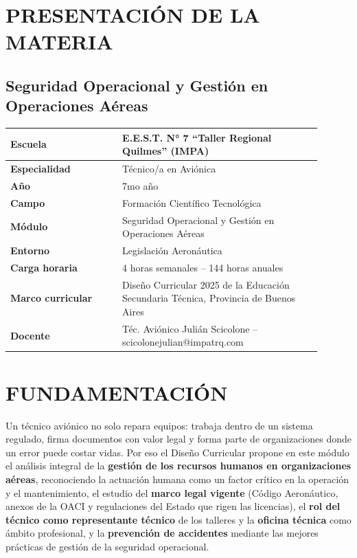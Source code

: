 \section*{PRESENTACIÓN DE LA MATERIA}
\subsection*{Seguridad Operacional y Gestión en Operaciones Aéreas}

\begin{center}
\small
\begin{tabular}{|p{0.32\linewidth}|p{0.58\linewidth}|}
\hline
\textbf{Escuela} & E.E.S.T. N° 7 ``Taller Regional Quilmes'' (IMPA) \\ \hline
\textbf{Especialidad} & Técnico/a en Aviónica \\ \hline
\textbf{Año} & 7mo año \\ \hline
\textbf{Campo} & Formación Científico Tecnológica \\ \hline
\textbf{Módulo} & Seguridad Operacional y Gestión en Operaciones Aéreas \\ \hline
\textbf{Entorno} & Legislación Aeronáutica \\ \hline
\textbf{Carga horaria} & 4 horas semanales -- 144 horas anuales \\ \hline
\textbf{Marco curricular} & Diseño Curricular 2025 de la Educación Secundaria Técnica, Provincia de
Buenos Aires \\ \hline
\textbf{Docente} & Téc. Aviónico Julián Scicolone -- scicolonejulian@impatrq.com \\ \hline
\end{tabular}
\end{center}

\section*{FUNDAMENTACIÓN}

Un técnico aviónico no solo repara equipos: trabaja dentro de un sistema regulado, firma
documentos con valor legal y forma parte de organizaciones donde un error puede costar vidas. Por
eso el Diseño Curricular propone en este módulo el análisis integral de la \textbf{gestión de los
recursos humanos en organizaciones aéreas}, reconociendo la actuación humana como un factor
crítico en la operación y el mantenimiento, el estudio del \textbf{marco legal vigente} (Código
Aeronáutico, anexos de la OACI y regulaciones del Estado que rigen las licencias), el
\textbf{rol del técnico como representante técnico} de los talleres y la \textbf{oficina técnica}
como ámbito profesional, y la \textbf{prevención de accidentes} mediante las mejores prácticas
de gestión de la seguridad operacional.

